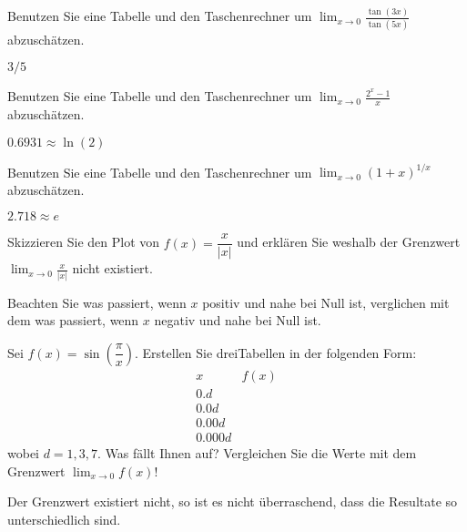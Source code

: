\begin{exercises}
\begin{exercise} 
Benutzen Sie eine Tabelle und den Taschenrechner um $\lim_{x\to 0}\frac{\tan(3x)}{\tan(5x)}$ abzuschätzen.
\begin{answer}
  $3/5$
\end{answer}
\end{exercise}

\begin{exercise} 
Benutzen Sie eine Tabelle und den Taschenrechner um $\lim_{x\to 0}
\frac{2^x-1}{x}$ abzuschätzen.
\begin{answer}
  $0.6931\approx\ln(2)$
\end{answer}
\end{exercise}

\begin{exercise} 
Benutzen Sie eine Tabelle und den Taschenrechner um $\lim_{x\to 0} (1+x)^{1/x}$ abzuschätzen. 
\begin{answer}
  $2.718 \approx e$
\end{answer}
\end{exercise}



\begin{exercise} 
Skizzieren Sie den Plot von $f(x) = \dfrac{x}{|x|}$ und erklären Sie weshalb der Grenzwert $\lim_{x\to
  0} \frac{x}{|x|}$ nicht existiert.
\begin{answer}
  Beachten Sie was passiert, wenn $x$ positiv und nahe bei Null ist, verglichen mit dem was passiert, wenn $x$ negativ und nahe bei Null ist.
\end{answer}
\end{exercise}



\begin{exercise} 
Sei $f(x) = \sin\left(\dfrac{\pi}{x}\right)$. Erstellen Sie dreiTabellen in der folgenden Form:
\[
\begin{array}{l|l}
 x & f(x) \\ \hline
 0.d &   \\
 0.0d &  \\
 0.00d &   \\
 0.000d &  
\end{array}
\]
wobei $d = 1,3,7$. Was fällt Ihnen auf? Vergleichen Sie die Werte mit dem Grenzwert $\lim_{x\to 0} f(x)$!
\begin{answer}
  Der Grenzwert existiert nicht, so ist es nicht überraschend, dass die Resultate so unterschiedlich sind.
\end{answer}
\end{exercise}



\end{exercises}
